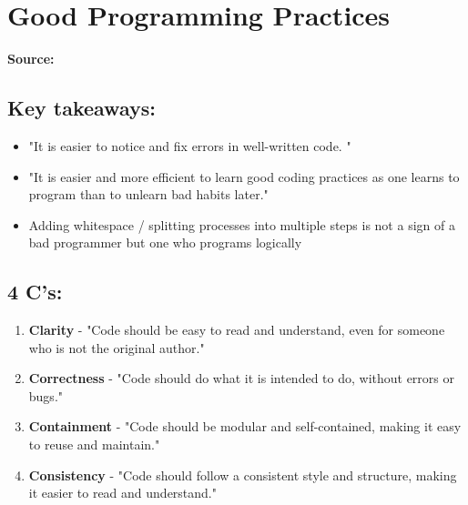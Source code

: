 \section{Good Programming Practices}
\label{research:GoodProgrammingPractices}
\textbf{Source:} \cite{pruimFosteringBetterCoding2023}

\subsection*{Key takeaways:}
\begin{itemize}
    \item "It is easier to notice and fix errors in well-written code. "
    \item "It is easier and more efficient to learn good coding practices as one learns to program than to unlearn bad habits later."
    \item Adding whitespace / splitting processes into multiple steps is not a sign of a bad programmer but one who programs logically
\end{itemize}

\subsection*{4 C's:}
\begin{enumerate}
    \item \textbf{Clarity} - "Code should be easy to read and understand, even for someone who is not the original author."
    \item \textbf{Correctness} - "Code should do what it is intended to do, without errors or bugs."
    \item \textbf{Containment} - "Code should be modular and self-contained, making it easy to reuse and maintain."
    \item \textbf{Consistency} - "Code should follow a consistent style and structure, making it easier to read and understand."
\end{enumerate}



